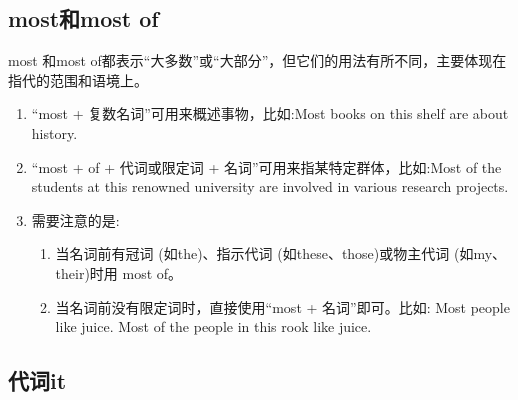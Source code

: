 \subsection{most和most of}

most 和most of都表示“大多数”或“大部分”，但它们的用法有所不同，主要体现在指代的范围和语境上。
\begin{enumerate}
  \item “most + 复数名词”可用来概述事物，比如:Most books on this shelf are about history.
  \item “most + of + 代词或限定词 + 名词”可用来指某特定群体，比如:Most of the students at this renowned university are involved in various research projects.
  \item 需要注意的是:
        \begin{enumerate}
          \item 当名词前有冠词 (如the)、指示代词 (如these、those)或物主代词 (如my、their)时用 most of。
          \item 当名词前没有限定词时，直接使用“most + 名词”即可。比如: Most people like juice. Most of the people in this rook like juice.
        \end{enumerate}
\end{enumerate}

\subsection{代词it}

